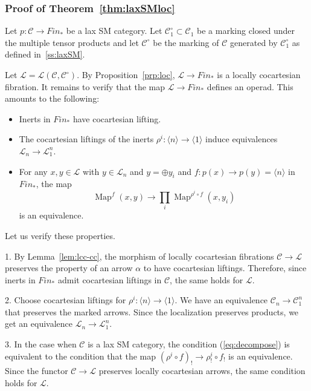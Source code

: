 \documentclass[12pt]{amsart}%
\newcommand{\Fin}{\mathit{Fin}}
\newcommand{\Map}{\operatorname{Map}}
\newcommand{\cC}{\mathcal{C}}
\newcommand{\cL}{\mathcal{L}}
\begin{document}
\subsubsection{Proof of Theorem~\ref{thm:laxSMloc}}

Let $p:\cC\to\Fin_*$ be a lax SM category. Let $\cC^\circ_1\subset\cC_1$
be a marking closed under the multiple tensor products and let $\cC^\circ$ be the marking of $\cC$ generated by $\cC_1^\circ$ as defined 
in~\ref{ss:laxSM}.
 
Let $\cL=\cL(\cC,\cC^\circ)$. By Proposition~\ref{prp:loc}, $\cL\to\Fin_*$
is a locally cocartesian fibration.
It remains to verify that the map $\cL\to\Fin_*$ defines an operad.
This amounts to the following:
\begin{itemize}
\item[1.] Inerts in $\Fin_*$ have cocartesian lifting.
\item[2.] The cocartesian liftings of the inerts
$\rho^i:\langle n\rangle\to\langle 1\rangle$
induce equivalences $\cL_n\to\cL_1^n$.
\item[3.] For any $x,y\in\cL$ with $y\in\cL_n$ and $y=\oplus y_i$
and $f:p(x)\to p(y)=\langle n\rangle$ in $\Fin_*$, 
the map  
\begin{equation}
\label{eq:decompose}
\Map^f(x,y)\to\prod_i\Map^{\rho^i\circ f}(x,y_i)
\end{equation}
is an equivalence.
\end{itemize}

Let us verify these properties.


1. By Lemma~\ref{lem:lcc-cc}, the morphism of locally cocartesian fibrations
$\cC\to\cL$ preserves the property of an arrow $\alpha$ to have cocartesian liftings. Therefore, since inerts in $\Fin_*$ admit cocartesian liftings in $\cC$, the same holds for $\cL$.

2. Choose cocartesian liftings for $\rho^i:\langle n\rangle\to\langle 1\rangle$.  We have an equivalence $\cC_n\to\cC_1^n$ that preserves the marked arrows. Since the localization preserves products, we get an equivalence $\cL_n\to\cL_1^n$.

3. In the case when $\cC$ is a lax SM category, the condition
(\ref{eq:decompose}) is equivalent to the condition 
that the map $(\rho^i\circ f)_!\to\rho^i_!\circ f_!$ is an equivalence.
Since the functor $\cC\to\cL$ preserves locally cocartesian arrows,
the same condition holds for $\cL$.
\end{document}
